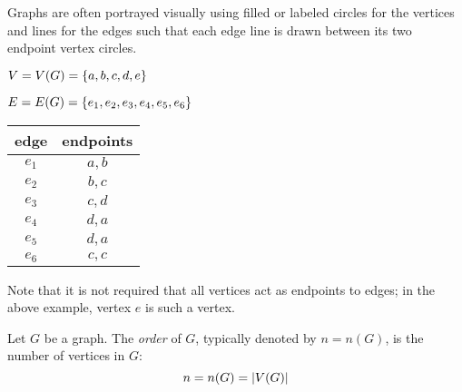 \documentclass[letterpaper,12pt,fleqn]{article}
\begin{document}
\begin{example}
  Graphs are often portrayed visually using filled or labeled circles for the vertices and lines for the edges such
  that each edge line is drawn between its two endpoint vertex circles.
  
  \begin{minipage}[t]{3.25in}
    \vspace{0in}
  \end{minipage}
  \begin{minipage}[t]{2.5in}
    \vspace{0.25in}
    \(V=V(G)=\set{a,b,c,d,e}\)

    \(E=E(G)=\set{e_1,e_2,e_3,e_4,e_5,e_6}\)

    \bigskip

    \begin{tabular}{c|c}
      edge & endpoints \\
      \hline
      \(e_1\) & \(a,b\) \\
      \(e_2\) & \(b,c\) \\
      \(e_3\) & \(c,d\) \\
      \(e_4\) & \(d,a\) \\
      \(e_5\) & \(d,a\) \\
      \(e_6\) & \(c,c\)
    \end{tabular}
  \end{minipage}

  Note that it is not required that all vertices act as endpoints to edges; in the above example, vertex \(e\) is
  such a vertex.
\end{example}

\begin{definition}[Order]
  Let \(G\) be a graph.  The \emph{order} of \(G\), typically denoted by \(n=n(G)\), is the number of vertices in
  \(G\):
  \[n=n(G)=\abs*{V(G)}\]
\end{definition}
\end{document}
